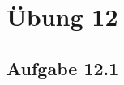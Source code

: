 \documentclass{standalone}
\begin{document}
\section{Übung 12}
\subsection{Aufgabe 12.1}
\end{document}
